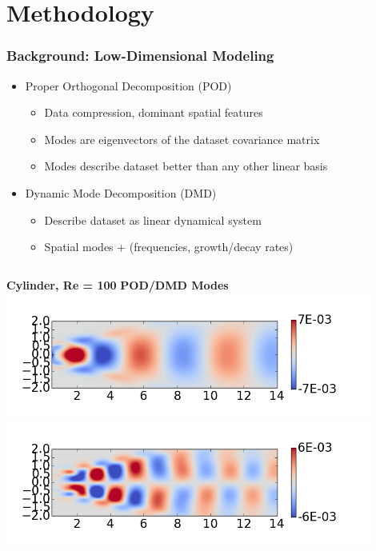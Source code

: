 \documentclass[9pt]{beamer}
\begin{document}
\section{Methodology}
\label{sec-2}
\begin{frame}
\frametitle{Background: Low-Dimensional Modeling}
\label{sec-2-1}

\begin{itemize}
\item Proper Orthogonal Decomposition (POD)
\begin{itemize}
\item Data compression, dominant spatial features
\item Modes are eigenvectors of the dataset covariance matrix
\item Modes describe dataset better than any other linear basis
\end{itemize}
\item Dynamic Mode Decomposition (DMD)
\begin{itemize}
\item Describe dataset as linear dynamical system
\item Spatial modes + (frequencies, growth/decay rates)
\end{itemize}
\end{itemize}
\begin{columns}[c]
   \centering
    \textbf{Cylinder, Re = 100}
   \centering
    \textbf{POD/DMD Modes} \\
    \includegraphics[width=0.9\textwidth]{CylinderRe100POD1} \\
    \includegraphics[width=0.9\textwidth]{CylinderRe100POD2}
\end{columns}
\end{frame}
\end{document}
